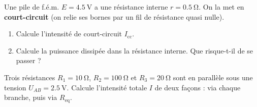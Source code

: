 \documentclass[11pt,a4paper]{article}
\begin{document}
\begin{exo}
Une pile de f.é.m. $E=\qty{4.5}{\volt}$ a une résistance interne $r=\qty{0.5}{\ohm}$. On la met en
\textbf{court-circuit} (on relie ses bornes par un fil de résistance quasi nulle).
\begin{enumerate}[label=\alph*)]
  \item Calcule l'intensité de court-circuit $I_{\text{cc}}$.
  \item Calcule la puissance dissipée dans la résistance interne. Que risque-t-il de se passer ?
\end{enumerate}
\end{exo}

\begin{exo}
Trois résistances $R_1=\qty{10}{\ohm}$, $R_2=\qty{100}{\ohm}$ et $R_3=\qty{20}{\ohm}$ sont en
parallèle sous une tension $U_{AB}=\qty{2.5}{\volt}$. Calcule l'intensité totale $I$ de deux façons :
via chaque branche, puis via $R_{\text{eq}}$.
\end{exo}
\end{document}
